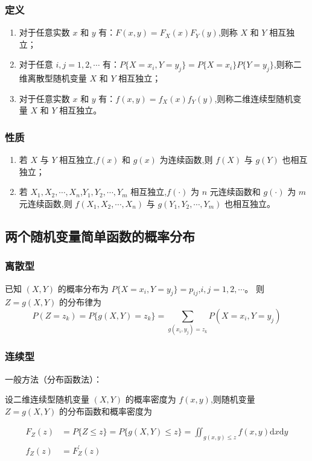 \documentclass[UTF8]{ctexart}
\theoremstyle{remark}
\begin{document}
		\subsubsection{定义}
		\begin{enumerate}
			\item 对于任意实数 \(x\) 和 \(y\) 有：\(F(x, y) = F_X(x)F_Y(y)\),则称 \(X\) 和 \(Y\) 相互独立；
			\item 对于任意 \(i, j = 1, 2, \cdots\) 有：\(P\{X = x_i, Y = y_j\} = P\{X = x_i\}P\{Y = y_j\}\),则称二维离散型随机变量 \(X\) 和 \(Y\) 相互独立；
			\item 对于任意实数 \(x\) 和 \(y\) 有：\(f(x, y) = f_X(x)f_Y(y)\),则称二维连续型随机变量 \(X\) 和 \(Y\) 相互独立。
		\end{enumerate}
		\subsubsection{性质}
		\begin{enumerate}
			\item 若 \(X\) 与 \(Y\) 相互独立,\(f(x)\) 和 \(g(x)\) 为连续函数,则 \(f(X)\) 与 \(g(Y)\) 也相互独立；
			\item 若 \(X_1, X_2, \cdots, X_n\),\(Y_1, Y_2, \cdots, Y_m\) 相互独立,\(f(\cdot)\) 为 \(n\) 元连续函数和 \(g(\cdot)\) 为 \(m\) 元连续函数,则 \(f(X_1, X_2, \cdots, X_n)\) 与 \(g(Y_1, Y_2, \cdots, Y_m)\) 也相互独立。
		\end{enumerate}
		
		\subsection{两个随机变量简单函数的概率分布}
		\subsubsection{离散型}
		已知 \((X, Y)\) 的概率分布为 \(P\{X = x_i, Y = y_j\} = p_{ij}\),\(i, j = 1, 2, \cdots\)。
		则 \(Z = g(X, Y)\) 的分布律为
		\[
		P(Z = z_k) = P\{g(X, Y) = z_k\} = \sum_{g(x_i, y_j) = z_k} P(X = x_i, Y = y_j)
		\]
		\subsubsection{连续型}
		一般方法（分布函数法）：
		
		设二维连续型随机变量 \((X, Y)\) 的概率密度为 \(f(x, y)\),则随机变量 \(Z = g(X, Y)\) 的分布函数和概率密度为
		
		\begin{align*}
			F_Z(z) &= P\{Z \leq z\} = P\{g(X, Y) \leq z\} = \iint_{g(x, y) \leq z} f(x, y) \mathrm{d}x \mathrm{d}y\\
			f_Z(z) &= F_Z^\prime(z)
		\end{align*}
		
\end{document}
